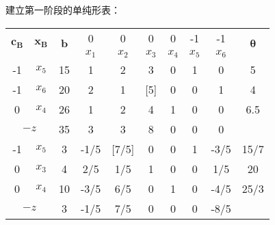 \documentclass{book}
\begin{document}
建立第一阶段的单纯形表：
\begin{table}[ht]
    \centering
    \begin{tabular}{c|c|c|cccccc|c}
        \hline
        \multirow{2}{*}{$\boldsymbol{c_B}$} & \multirow{2}{*}{$\boldsymbol{x_B}$} & \multirow{2}{*}{$\boldsymbol{b}$} & 0     & 0     & 0     & 0     & -1    & -1    & \multirow{2}{*}{$\boldsymbol{\theta}$} \\
        \cline{4-9}
                                            &                                     &                                   & $x_1$ & $x_2$ & $x_3$ & $x_4$ & $x_5$ & $x_6$ &                                        \\
        \hline
        -1                                  & $x_5$                               & 15                                & 1     & 2     & 3     & 0     & 1     & 0     & 5                                      \\
        -1                                  & $x_6$                               & 20                                & 2     & 1     & [5]   & 0     & 0     & 1     & 4                                      \\
        0                                   & $x_4$                               & 26                                & 1     & 2     & 4     & 1     & 0     & 0     & 6.5                                    \\
        \hline
        \multicolumn{2}{c|}{$-z$}           & 35                                  & 3                                 & 3     & 8     & 0     & 0     & 0     &                                                \\
        \hline
        -1                                  & $x_5$                               & 3                                 & -1/5  & [7/5] & 0     & 0     & 1     & -3/5  & 15/7                                   \\
        0                                   & $x_3$                               & 4                                 & 2/5   & 1/5   & 1     & 0     & 0     & 1/5   & 20                                     \\
        0                                   & $x_4$                               & 10                                & -3/5  & 6/5   & 0     & 1     & 0     & -4/5  & 25/3                                   \\
        \hline
        \multicolumn{2}{c|}{$-z$}           & 3                                   & -1/5                              & 7/5   & 0     & 0     & 0     & -8/5  &                                                \\

\end{tabular}
\end{table}
\end{document}
